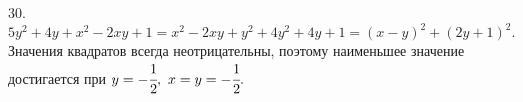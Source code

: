 30. $5y^2+4y+x^2-2xy+1=x^2-2xy+y^2+4y^2+4y+1=(x-y)^2+(2y+1)^2.$ Значения квадратов всегда неотрицательны, поэтому наименьшее значение достигается при $y=-\cfrac{1}{2},\ x=y=-\cfrac{1}{2}.$\\
